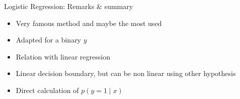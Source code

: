 \documentclass[
  9pt,
  ignorenonframetext,
  aspectratio=169,
  t, dvipsnames]{beamer}
\providecommand{\tightlist}{%
  \setlength{\itemsep}{0pt}\setlength{\parskip}{0pt}}\usepackage{longtable,booktabs,array}
\theoremstyle{definition}
\begin{document}
\begin{frame}{Logistic Regression: Remarks \& summary}
\protect\hypertarget{logistic-regression-remarks-summary}{}
\begin{itemize}
\tightlist
\item
  Very famous method and maybe the most used
\item
  Adapted for a binary \(y\)
\item
  Relation with linear regression
\item
  Linear decision boundary, but can be non linear using other hypothesis
\item
  Direct calculation of \(p(y=1 \mid x)\)
\end{itemize}
\end{frame}
\end{document}
